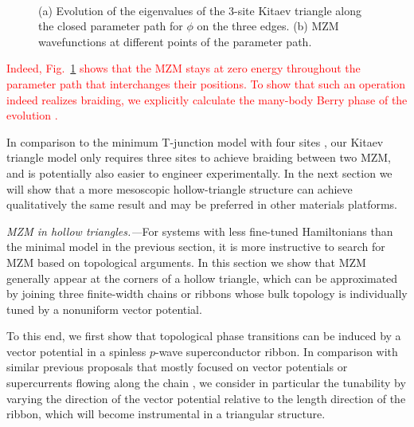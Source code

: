 \documentclass[aps,prb,showpacs,amsmath,twocolumn,amssymb,superscriptaddress]{revtex4-2}
\newcommand{\Red}[1]{\textcolor{red}{#1}}
\begin{document}
\begin{figure}[ht]
	\centering
	\\
	\caption{(a) Evolution of the eigenvalues of the 3-site Kitaev triangle along the closed parameter path for $\phi$ on the three edges. (b) MZM wavefunctions at different points of the parameter path.} 
	\label{fig:3eig}
\end{figure}

\Red{Indeed, Fig.~\ref{fig:3eig} shows that the MZM stays at zero energy throughout the parameter path that interchanges their positions. To show that such an operation indeed realizes braiding, we explicitly calculate the many-body Berry phase of the evolution \cite{aliceaNonAbelianStatisticsTopological2011,Li_2016}.}

In comparison to the minimum T-junction model with four sites \cite{aliceaNonAbelianStatisticsTopological2011}, our Kitaev triangle model only requires three sites to achieve braiding between two MZM, and is potentially also easier to engineer experimentally. In the next section we will show that a more mesoscopic hollow-triangle structure can achieve qualitatively the same result and may be preferred in other materials platforms.

\emph{MZM in hollow triangles.---}For systems with less fine-tuned Hamiltonians than the minimal model in the previous section, it is more instructive to search for MZM based on topological arguments. In this section we show that MZM generally appear at the corners of a hollow triangle, which can be approximated by joining three finite-width chains or ribbons whose bulk topology is individually tuned by a nonuniform vector potential. 

To this end, we first show that topological phase transitions can be induced by a vector potential in a spinless $p$-wave superconductor ribbon. In comparison with similar previous proposals that mostly focused on vector potentials or supercurrents flowing along the chain \cite{romitoManipulatingMajoranaFermions2012, takasanSupercurrentinducedTopologicalPhase2022}, we consider in particular the tunability by varying the direction of the vector potential relative to the length direction of the ribbon, which will become instrumental in a triangular structure.
\end{document}
